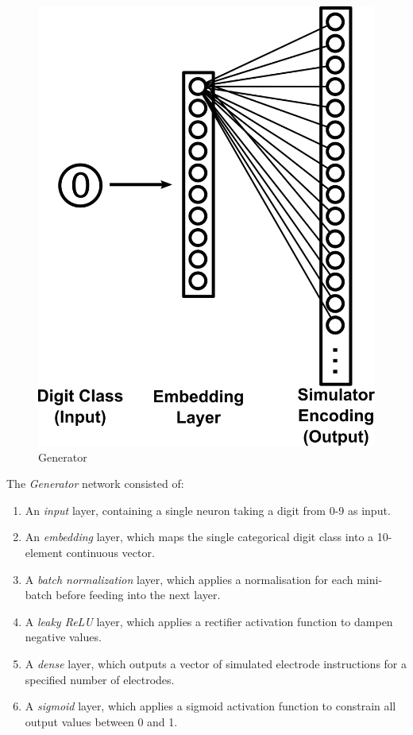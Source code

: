 \documentclass[a4paper,11pt,openany]{book}
\begin{document}
\begin{figure}[htbp]
\centering
\includegraphics[width=.9\linewidth]{./images/generator.png}
\caption{\label{fig:org2a803ae}
Generator}
\end{figure}

The \emph{Generator} network consisted of:
\begin{enumerate}
\item An \emph{input} layer, containing a single neuron taking a digit from 0-9 as input.
\item An \emph{embedding} layer, which maps the single categorical digit class into a 10-element continuous vector.
\item A \emph{batch normalization} layer, which applies a normalisation for each mini-batch before feeding into the next layer.
\item A \emph{leaky ReLU} layer, which applies a rectifier activation function to dampen negative values.
\item A \emph{dense} layer, which outputs a vector of simulated electrode instructions for a specified number of electrodes.
\item A \emph{sigmoid} layer, which applies a sigmoid activation function to constrain all output values between 0 and 1.
\end{enumerate}
\end{document}

